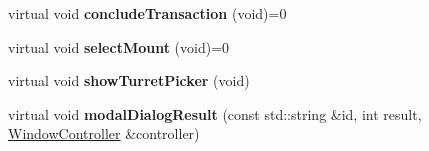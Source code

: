 \begin{DoxyCompactItemize}
\item 
virtual void {\bfseries conclude\+Transaction} (void)=0\hypertarget{classBaseComputer_1_1UpgradeOperation_a08575faae1f64c00f9d40b1b9ab82852}{}\label{classBaseComputer_1_1UpgradeOperation_a08575faae1f64c00f9d40b1b9ab82852}

\item 
virtual void {\bfseries select\+Mount} (void)=0\hypertarget{classBaseComputer_1_1UpgradeOperation_a7a2698187cc90e2339717a3de38a994a}{}\label{classBaseComputer_1_1UpgradeOperation_a7a2698187cc90e2339717a3de38a994a}

\item 
virtual void {\bfseries show\+Turret\+Picker} (void)\hypertarget{classBaseComputer_1_1UpgradeOperation_a444ae348f5c07cda9d92e005508d8ee5}{}\label{classBaseComputer_1_1UpgradeOperation_a444ae348f5c07cda9d92e005508d8ee5}

\item 
virtual void {\bfseries modal\+Dialog\+Result} (const std\+::string \&id, int result, \hyperlink{classWindowController}{Window\+Controller} \&controller)\hypertarget{classBaseComputer_1_1UpgradeOperation_a4bee30c0d6428df0595c9131464c5184}{}\label{classBaseComputer_1_1UpgradeOperation_a4bee30c0d6428df0595c9131464c5184}

\end{DoxyCompactItemize}
